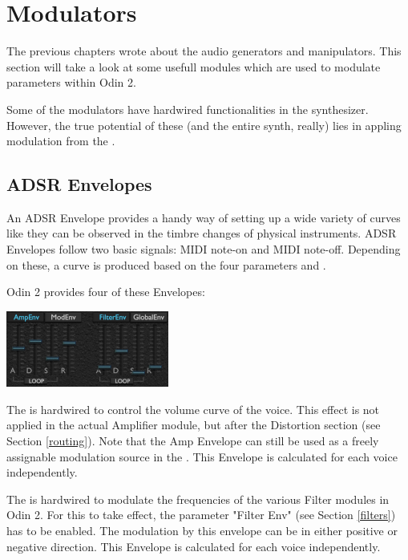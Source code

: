 \chapter{Modulators}
The previous chapters wrote about the audio generators and manipulators. This section will take a look at some usefull modules which are used to modulate parameters within Odin 2. 

Some of the modulators have hardwired functionalities in the synthesizer. However, the true potential of these (and the entire synth, really) lies in appling modulation from the \modmatrix.

\section{ADSR Envelopes}
\label{ADSR}
An ADSR Envelope provides a handy way of setting up a wide variety of curves like they can be observed in the timbre changes of physical instruments. ADSR Envelopes follow two basic signals: MIDI note-on and MIDI note-off. Depending on these, a curve is produced based on the four parameters  and .

Odin 2 provides four of these Envelopes:

\begin{center}
    \includegraphics[width=0.4\textwidth]{graphics/ADSR_section.png}
\end{center}

The  is hardwired to control the volume curve of the voice. This effect is not applied in the actual Amplifier module, but after the Distortion section (see Section \ref{routing}). Note that the Amp Envelope can still be used as a freely assignable modulation source in the \modmatrix. This Envelope is calculated for each voice independently.
\label{amp_env}

The  is hardwired to modulate the frequencies of the various Filter modules in Odin 2. For this to take effect, the parameter "Filter Env" (see Section \ref{filters}) has to be enabled. The modulation by this envelope can be in either positive or negative direction. This Envelope is calculated for each voice independently.

